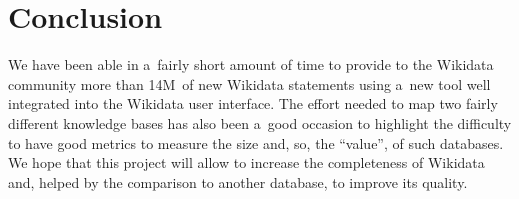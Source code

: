 \documentclass{sig-alternate}
\begin{document}
\section{Conclusion}

We have been able in a~fairly short amount of time to provide to the Wikidata community
more than 14M~of new Wikidata statements using a~new tool
well integrated into the Wikidata user interface.
The effort needed to map two fairly different knowledge bases has also been a~good occasion
to highlight the difficulty to have good metrics to measure the size
and, so, the ``value'', of such databases.
We hope that this project will allow to increase the completeness of Wikidata and,
helped by the comparison to another database, to improve its quality.




\balancecolumns
\end{document}
